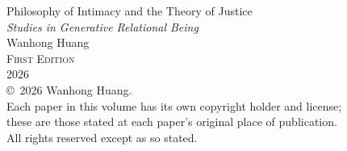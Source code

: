 \thispagestyle{empty}
\null\vfill
\begin{center}
{\small\color{ink}
Philosophy of Intimacy and the Theory of Justice\\[0.25em]
{\itshape Studies in Generative Relational Being}\\[1.4em]
Wanhong Huang\\[1.8em]
{\scshape\color{rosedeep} First Edition}\\[0.35em]
2026\\[1.8em]
{\footnotesize\copyright\ 2026 Wanhong Huang.\\[0.35em]
Each paper in this volume has its own copyright holder and license;\\[0.1em]
these are those stated at each paper's original place of publication.\\[0.1em]
All rights reserved except as so stated.}
}
\end{center}
\vfill\null
\clearpage
